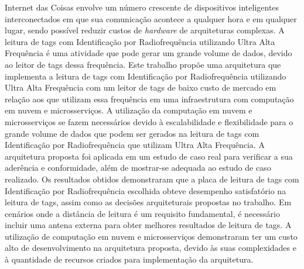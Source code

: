 Internet das Coisas envolve um número crescente de dispositivos inteligentes interconectados em que sua comunicação acontece a qualquer hora e em qualquer lugar, sendo possível reduzir custos de \textit{hardware} de arquiteturas complexas. A leitura de tags com Identificação por Radiofrequência utilizando Ultra Alta Frequência é uma atividade que pode gerar um grande volume de dados, devido ao leitor de tags dessa frequência. Este trabalho propõe uma arquitetura que implementa a leitura de tags com Identificação por Radiofrequência utilizando Ultra Alta Frequência com um leitor de tags de baixo custo de mercado em relação aos que utilizam essa frequência em uma infraestrutura com computação em nuvem e microsserviços. A utilização da computação em nuvem e microsserviços se fazem necessários devido à escalabilidade e flexibilidade para o grande volume de dados que podem ser gerados na leitura de tags com Identificação por Radiofrequência que utilizam Ultra Alta Frequência. A arquitetura proposta foi aplicada em um estudo de caso real para verificar a sua aderência e conformidade, além de mostrar-se adequada ao estudo de caso realizado. Os resultados obtidos demonstraram que a placa de leitura de tags com Identificação por Radiofrequência escolhida obteve desempenho satisfatório na leitura de tags, assim como as decisões arquiteturais propostas no trabalho. Em cenários onde a distância de leitura é um requisito fundamental, é necessário incluir uma antena externa para obter melhores resultados de leitura de tags. A utilização de computação em nuvem e microsserviços demonstraram ter um custo alto de desenvolvimento na arquitetura proposta, devido às suas complexidades e à quantidade de recursos criados para implementação da arquitetura.